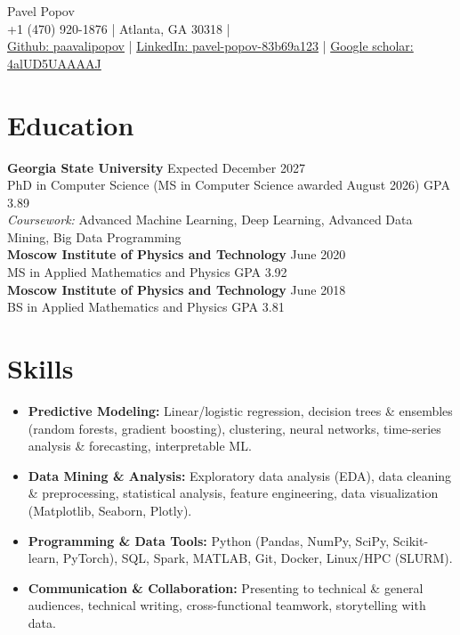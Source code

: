 \documentclass[11pt,a4paper]{article}
\begin{document}
\begin{center}
  {\Huge Pavel Popov}\\[0.5em]
  {\footnotesize +1 (470) 920-1876 \quad | \quad Atlanta, GA 30318} \quad | \\
  {\small \href{https://github.com/paavalipopov}{Github: paavalipopov} \quad | \quad
  \href{https://www.linkedin.com/in/pavel-popov-83b69a123/}{LinkedIn: pavel-popov-83b69a123} \quad | \quad
  \href{https://scholar.google.com/citations?user=4alUD5UAAAAJ}{Google scholar: 4alUD5UAAAAJ}}
\end{center}

\section*{Education}
\noindent\textbf{Georgia State University} \hfill Expected December 2027\\
PhD in Computer Science (MS in Computer Science awarded August 2026) \hfill GPA 3.89\\
{\small\textit{Coursework:} Advanced Machine Learning, Deep Learning, Advanced Data Mining, Big Data Programming}\\[0.3em]
\textbf{Moscow Institute of Physics and Technology} \hfill June 2020\\
MS in Applied Mathematics and Physics \hfill
GPA 3.92\\[0.3em]
\textbf{Moscow Institute of Physics and Technology} \hfill June 2018\\
BS in Applied Mathematics and Physics \hfill
GPA 3.81

\section*{Skills}
\begin{itemize}
[leftmargin=*,noitemsep]
\item \textbf{Predictive Modeling:} Linear/logistic regression, decision trees \& ensembles (random forests, gradient boosting), clustering, neural networks, time-series analysis \& forecasting, interpretable ML.
\item \textbf{Data Mining \& Analysis:} Exploratory data analysis (EDA), data cleaning \& preprocessing, statistical analysis, feature engineering, data visualization (Matplotlib, Seaborn, Plotly).
\item \textbf{Programming \& Data Tools:} Python (Pandas, NumPy, SciPy, Scikit-learn, PyTorch), SQL, Spark, MATLAB, Git, Docker, Linux/HPC (SLURM).
\item \textbf{Communication \& Collaboration:} Presenting to technical \& general audiences, technical writing, cross-functional teamwork, storytelling with data.
\end{itemize}
\end{document}
